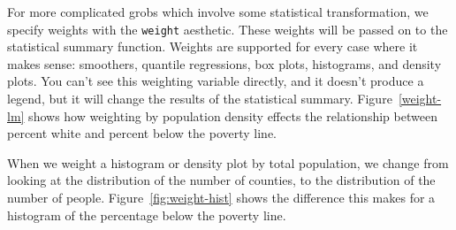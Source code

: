 For more complicated grobs which involve some statistical transformation, we specify weights with the {\tt weight} aesthetic.  These weights will be passed on to the statistical summary function.  Weights are supported for every case where it makes sense: smoothers, quantile regressions, box plots, histograms, and density plots.  You can't see this weighting variable directly, and it doesn't produce a legend, but it will change the results of the statistical summary.  Figure~\ref{weight-lm} shows how weighting by population density effects the relationship between percent white and percent below the poverty line.

%


When we weight a histogram or density plot by total population, we change from looking at the distribution of the number of counties, to the distribution of the number of people.  Figure~\ref{fig:weight-hist} shows the difference this makes for a histogram of the percentage below the poverty line.

%



